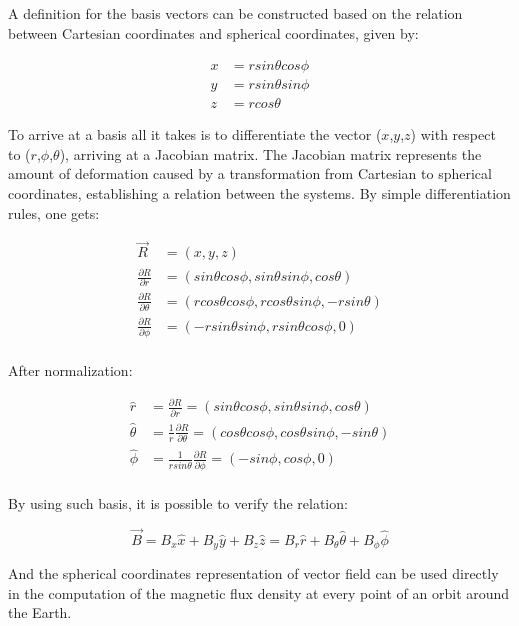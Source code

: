 \indent
A definition for the basis vectors can be constructed based on the relation between Cartesian coordinates and spherical coordinates, given by:

\begin{align*}
	x &= r sin \theta cos \phi \\
	y &= r sin \theta sin \phi \\
	z &= r cos \theta
\end{align*}
 
\indent
To arrive at a basis all it takes is to differentiate the vector ($x$,$y$,$z$) with respect to ($r$,$\phi$,$\theta$), arriving at a Jacobian matrix. The Jacobian matrix represents the amount of deformation caused by a transformation from Cartesian to spherical coordinates, establishing a relation between the systems. By simple differentiation rules, one gets:

\begin{align*}
	\vec{R} &= (x,y,z) \\
	\frac{\partial R}{\partial r} &= (sin\theta cos\phi,sin\theta sin\phi,cos\theta) \\
	\frac{\partial R}{\partial \theta} &= (rcos\theta cos\phi, rcos\theta sin\phi, -rsin\theta) \\
	\frac{\partial R}{\partial \phi} &= (-rsin\theta sin\phi, rsin\theta cos\phi, 0) \\
\end{align*}

\indent
After normalization:

\begin{align*}
	\hat{r} &= \frac{\partial R}{\partial r} = (sin\theta cos\phi,sin\theta sin\phi,cos\theta) \\
	\hat{\theta} &= \frac{1}{r}\frac{\partial R}{\partial \theta}  = (cos\theta cos\phi, cos\theta sin\phi, -sin\theta) \\
	\hat{\phi} &= \frac{1}{r sin \theta}\frac{\partial R}{\partial \phi} = (-sin\phi, cos\phi, 0) \\
\end{align*}

\indent 
By using such basis, it is possible to verify the relation: 

\begin{equation}
	\vec{B} = B_{x}\hat{x} + B_{y}\hat{y} + B_{z}\hat{z} = B_{r}\hat{r} + B_{\theta}\hat{\theta} + B_{\phi}\hat{\phi}
\end{equation}

\indent
And the spherical coordinates representation of vector field can be used directly in the computation of the magnetic flux density at every point of an orbit around the Earth.

